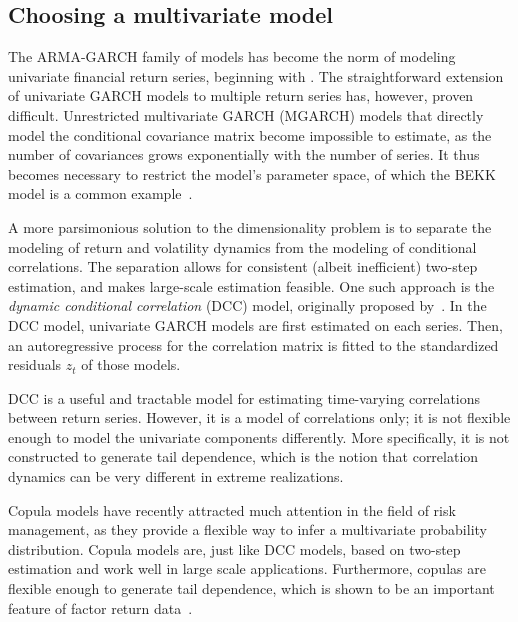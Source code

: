 
\subsection{Choosing a multivariate model}
\label{sub:05_01_choosing}
The ARMA-GARCH family of models has become the norm of modeling univariate financial return series, beginning with \textcite{Bollerslev1986}. The straightforward extension of univariate GARCH models to multiple return series has, however, proven difficult. Unrestricted multivariate GARCH (MGARCH) models that directly model the conditional covariance matrix become impossible to estimate, as the number of covariances grows exponentially with the number of series. It thus becomes necessary to restrict the model's parameter space, of which the BEKK model is a common example~\autocite{BEKKModel}.

A more parsimonious solution to the dimensionality problem is to separate the modeling of return and volatility dynamics from the modeling of conditional correlations. The separation allows for consistent (albeit inefficient) two-step estimation, and makes large-scale estimation feasible. One such approach is the \emph{dynamic conditional correlation} (DCC) model, originally proposed by~\autocite{Engle2002}. In the DCC model, univariate GARCH models are first estimated on each series. Then, an autoregressive process for the correlation matrix is fitted to the standardized residuals ${z_t}$ of those models. 

DCC is a useful and tractable model for estimating time-varying correlations between return series. However, it is a model of correlations only; it is not flexible enough to model the univariate components differently. More specifically, it is not constructed to generate tail dependence, which is the notion that correlation dynamics can be very different in extreme realizations. 

Copula models have recently attracted much attention in the field of risk management, as they provide a flexible way to infer a multivariate probability distribution. Copula models are, just like DCC models, based on two-step estimation and work well in large scale applications. Furthermore, copulas are flexible enough to generate tail dependence, which is shown to be an important feature of factor return data~\autocite{ChristoffersenLanglois2013}. 

